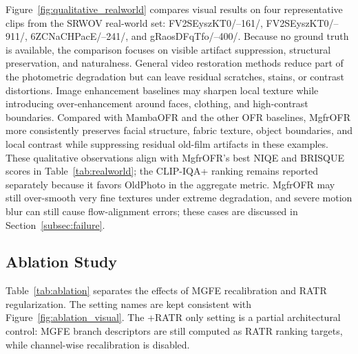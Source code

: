 \documentclass[symmetry,article,submit,pdftex,moreauthors]{Definitions/mdpi}
\begin{document}
Figure~\ref{fig:qualitative_realworld} compares visual results on four representative clips from the SRWOV real-world set: FV2SEyszKT0/--161/, FV2SEyszKT0/--911/, 6ZCNaCHPacE/--241/, and gRaosDFqTfo/--400/. Because no ground truth is available, the comparison focuses on visible artifact suppression, structural preservation, and naturalness. General video restoration methods reduce part of the photometric degradation but can leave residual scratches, stains, or contrast distortions. Image enhancement baselines may sharpen local texture while introducing over-enhancement around faces, clothing, and high-contrast boundaries. Compared with MambaOFR and the other OFR baselines, MgfrOFR more consistently preserves facial structure, fabric texture, object boundaries, and local contrast while suppressing residual old-film artifacts in these examples. These qualitative observations align with MgfrOFR's best NIQE and BRISQUE scores in Table~\ref{tab:realworld}; the CLIP-IQA+ ranking remains reported separately because it favors OldPhoto in the aggregate metric. MgfrOFR may still over-smooth very fine textures under extreme degradation, and severe motion blur can still cause flow-alignment errors; these cases are discussed in Section~\ref{subsec:failure}.



\FloatBarrier

\subsection{Ablation Study}
\label{subsec:ablation}

Table~\ref{tab:ablation} separates the effects of MGFE recalibration and RATR regularization. The setting names are kept consistent with Figure~\ref{fig:ablation_visual}. The +RATR only setting is a partial architectural control: MGFE branch descriptors are still computed as RATR ranking targets, while channel-wise recalibration is disabled.
\end{document}
